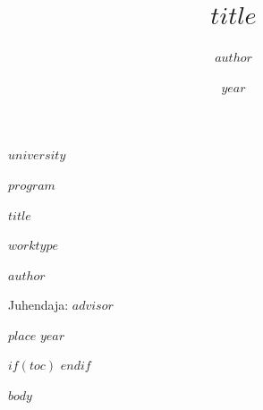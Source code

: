 \documentclass[12pt,a4paper]{report}
\title{$title$}
\author{$author$}
\date{$year$}
\begin{document}
\begin{titlepage}
\centering
\vspace*{2cm}
{\Large\bfseries $university$\par}
\vspace{1cm}
{\large $program$\par}
\vspace{3cm}
{\LARGE\bfseries $title$\par}
\vspace{1cm}
{\large $worktype$\par}
\vspace{3cm}
{\large $author$\par}
\vspace{1cm}
{\normalsize Juhendaja: $advisor$\par}
\vfill
{\normalsize $place$ $year$\par}
\end{titlepage}

$if(toc)$
\tableofcontents
\newpage
$endif$

$body$
\end{document}
